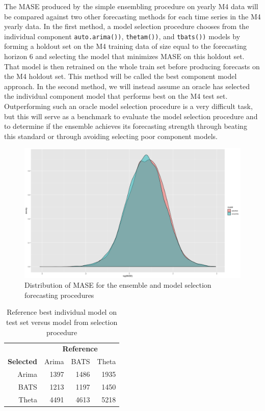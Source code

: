 \documentclass[11pt,3p,review,authoryear]{elsarticle}
\begin{document}
The MASE produced by the simple ensembling procedure on yearly M4 data will be compared against two other forecasting methods for each time series in the M4 yearly data. In the first method, a model selection procedure chooses from the individual component \texttt{auto.arima())}, \texttt{thetam())}, and \texttt{tbats())} models by forming a holdout set on the M4 training data of size equal to the forecasting horizon 6 and selecting the model that minimizes MASE on this holdout set. That model is then retrained on the whole train set before producing forecasts on the M4 holdout set. This method will be called the best component model approach. In the second method, we will instead assume an oracle has selected the individual component model that performs best on the M4 test set. Outperforming such an oracle model selection procedure is a very difficult task, but this will serve as a benchmark to evaluate the model selection procedure and to determine if the ensemble achieves its forecasting strength through beating this standard or through avoiding selecting poor component models.


\begin{figure}[h]
\centering
\includegraphics[width=1.0\textwidth]{distribution}
\caption{Distribution of MASE for the ensemble and model selection forecasting procedures}
\end{figure}

\begin{table}[ht]
\centering
\begin{tabular}{rrrr}
  \hline
  & \multicolumn{3}{c}{\textbf{Reference}} \\
 \textbf{Selected} & Arima & BATS & Theta  \\
 \hline
 Arima & 1397 & 1486 & 1935 \\ 
   BATS & 1213 & 1197 & 1450 \\ 
  Theta & 4491 & 4613 & 5218 \\ 
   \hline
\end{tabular}
\caption{Reference best individual model on test set versus model from selection procedure}
\end{table}
\end{document}
